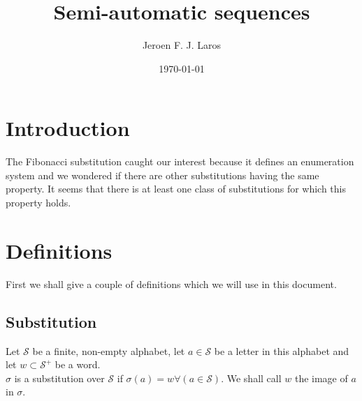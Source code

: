 \documentclass{article}
\title{\Huge{Semi-automatic sequences}}
\author{Jeroen F. J. Laros}
\date{\today}
\begin{document}
\newcommand{\qed}{$\blacksquare$}
\newcommand{\monoit}[1]{\texttt{\textit{#1}}}
\newcommand{\spaces}{\;\;\;\;\;\;\;\;\;\;\;\;\;\;\;\;\;\;\;\;\;\;\;\;\;\;\;\;\;
\;\;\;\;\;\;\;\;\;\;\;\;\;\;\;\;\;\;\;\;\;\;\;\;\;\;\;\;\;\;\;\;\;\;\;\;\;\;\;
\;\;\;\;\;\;\;\;\;\;\;\;\;\;\;\;\;\;\;\;\;\;\;\;\;\;}

\maketitle
\newpage

\tableofcontents
\newpage

\section{Introduction}
The Fibonacci substitution caught our interest because it defines an 
enumeration system and we wondered if there are other substitutions having the
same property. It seems that there is at least one class of substitutions
for which this property holds.

\section{Definitions}
First we shall give a couple of definitions which we will use in this document.

\subsection{Substitution}
Let $\mathcal{S}$ be a finite, non-empty alphabet, let $a \in \mathcal{S}$ be
a letter in this alphabet and let $w \subset \mathcal{S}^+$ be a word.\\
$\sigma$ is a substitution over $\mathcal{S}$ if 
$\sigma(a) = w \forall(a \in \mathcal{S})$. We shall call $w$ the image of $a$
in $\sigma$.
\end{document}
